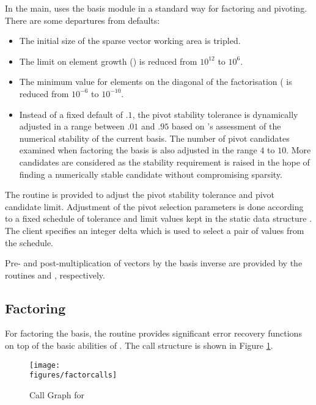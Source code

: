 In the main, \dylp uses the basis module in a standard way for
factoring and pivoting.
There are some departures from \glpk defaults:
\begin{itemize}
  \item
  The initial size of the sparse vector working area is tripled.

  \item
  The limit on element growth () is reduced from
  $10^{12}$ to $10^6$.

  \item
  The minimum value for elements on the diagonal of the factorisation
  ( is reduced from $10^{-6}$ to $10^{-10}$.

  \item
  Instead of a fixed default of $.1$, the pivot stability tolerance is
  dynamically adjusted in a range between $.01$ and $.95$ based on \dylp's
  assessment of the numerical stability of the current basis.
  The number of pivot candidates examined when factoring the basis is
  also adjusted in the range $4$ to $10$.
  More candidates are considered as the stability requirement is raised
  in the hope of finding a numerically stable candidate without compromising
  sparsity.
\end{itemize}

The routine  is provided to adjust the pivot stability
tolerance and pivot candidate limit.
Adjustment of the pivot selection parameters is done according to a
fixed schedule of tolerance and limit values
kept in the static data structure .
The client specifies an integer delta which is used to select a pair of
values from the schedule.

Pre- and post-multiplication of vectors by the basis inverse are provided by
the routines  and , respectively.

\subsection{Factoring}
\label{sec:BasisFactoring}

For factoring the basis, the routine  provides
significant error recovery functions
on top of the basic abilities of \glpk.
The call structure is shown in Figure 
\ref{fig:FactorCallGraph}.
\begin{figure}[htb]
\centering
\texttt{[image: \\figures/factorcalls]}
\caption{Call Graph for \protect{}} \label{fig:FactorCallGraph}
\end{figure}

